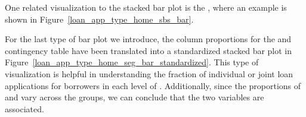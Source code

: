 One related visualization to the stacked bar plot is the
,
where an example is shown in
Figure~\ref{loan_app_type_home_sbs_bar}.

For the last type of bar plot we introduce,
the column proportions for the
 and  contingency table
have been translated into a standardized stacked bar plot
in Figure~\ref{loan_app_type_home_seg_bar_standardized}.
This type of visualization is helpful in understanding
the fraction of individual or joint loan applications
for borrowers in each level of .
Additionally, since the proportions of 
and  vary across the groups,
we can conclude that the two variables are associated.

\newcommand{\loanapptypehomesegbarplotwidth}{0.46\textwidth}
